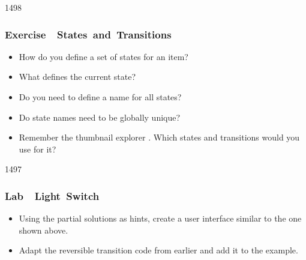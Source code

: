 \begin{slide}{1498}\frametitle{Exercise~\textendash~States~and~Transitions}

\begin{itemize}
\item How do you define a set of states for an item?
\item What defines the current state?
\item Do you need to define a name for all states?
\item Do state names need to be globally unique?
\item Remember the thumbnail explorer . Which states and transitions would you use for it?
\end{itemize}

\end{slide}

\begin{slide}{1497}\frametitle{Lab~\textendash~Light~Switch}

\vspace*{-1em}
\begin{center}
\hspace*{0.5em}
\end{center}

\vspace*{-0.5em}
\begin{itemize}
\item Using the partial solutions as hints, create a user interface similar
to the one shown above.
\item Adapt the reversible transition code from earlier and add it to the
example. 

\end{itemize}

\end{slide}

                                                                   
